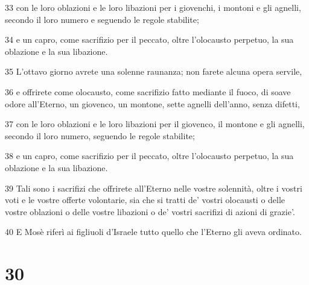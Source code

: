 \par 33 con le loro oblazioni e le loro libazioni per i giovenchi, i montoni e gli agnelli, secondo il loro numero e seguendo le regole stabilite;
\par 34 e un capro, come sacrifizio per il peccato, oltre l'olocausto perpetuo, la sua oblazione e la sua libazione.
\par 35 L'ottavo giorno avrete una solenne raunanza; non farete alcuna opera servile,
\par 36 e offrirete come olocausto, come sacrifizio fatto mediante il fuoco, di soave odore all'Eterno, un giovenco, un montone, sette agnelli dell'anno, senza difetti,
\par 37 con le loro oblazioni e le loro libazioni per il giovenco, il montone e gli agnelli, secondo il loro numero, seguendo le regole stabilite;
\par 38 e un capro, come sacrifizio per il peccato, oltre l'olocausto perpetuo, la sua oblazione e la sua libazione.
\par 39 Tali sono i sacrifizi che offrirete all'Eterno nelle vostre solennità, oltre i vostri voti e le vostre offerte volontarie, sia che si tratti de' vostri olocausti o delle vostre oblazioni o delle vostre libazioni o de' vostri sacrifizi di azioni di grazie'.
\par 40 E Mosè riferì ai figliuoli d'Israele tutto quello che l'Eterno gli aveva ordinato.

\chapter{30}


